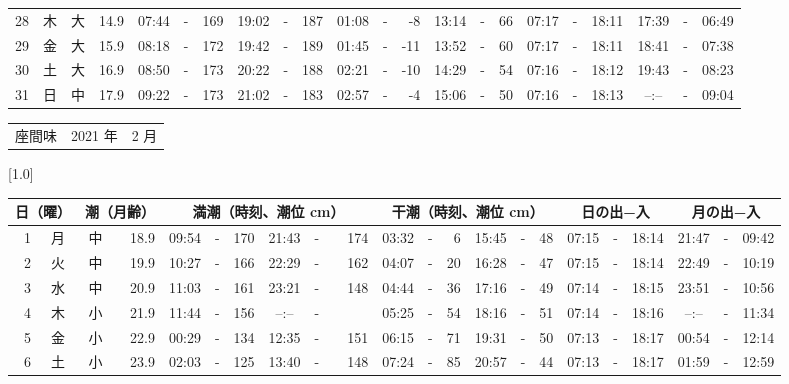 \documentclass[12pt,a4j]{jsarticle}
\begin{document}
\begin{table}[htbp]
\begin{center}
{\begin{tabular}{|rc|cr|ccrccr|ccrccr|ccc|ccc|}
28 & 木 & 大 & 14.9 &  07:44 &-& 169 &  19:02 &-& 187 &  01:08 &-&  -8 &  13:14 &-&  66 & 07:17 & -& 18:11 & 17:39 & -& 06:49 \\
29 & 金 & 大 & 15.9 &  08:18 &-& 172 &  19:42 &-& 189 &  01:45 &-& -11 &  13:52 &-&  60 & 07:17 & -& 18:11 & 18:41 & -& 07:38 \\
30 & 土 & 大 & 16.9 &  08:50 &-& 173 &  20:22 &-& 188 &  02:21 &-& -10 &  14:29 &-&  54 & 07:16 & -& 18:12 & 19:43 & -& 08:23 \\
31 & 日 & 中 & 17.9 &  09:22 &-& 173 &  21:02 &-& 183 &  02:57 &-&  -4 &  15:06 &-&  50 & 07:16 & -& 18:13 & --:-- & -& 09:04 \\
   \hline
   \end{tabular}}
   \end{center}
\end{table}
\newpage
 \begin{table}[htbp]
 \begin{center}
 \begin{tabular}{lcc}
 \LARGE{座間味}  & \large{2021 年} & \large{ 2 月} \\
 \end{tabular}
 \end{center}
 \begin{center}
    \scalebox{0.7}[1.0]{
    \begin{tabular}{|rc|cr|ccrccr|ccrccr|ccc|ccc|}
    \hline
    \multicolumn{2}{|c|}{日（曜）} & \multicolumn{2}{c|}{潮（月齢）} & \multicolumn{6}{c|}{満潮（時刻、潮位 cm）} & \multicolumn{6}{c|}{干潮（時刻、潮位 cm）} & \multicolumn{3}{c|}{日の出−入} &  \multicolumn{3}{c|}{月の出−入}\\
 \hline
 1 & 月 & 中 & 18.9 &  09:54 &-& 170 &  21:43 &-& 174 &  03:32 &-&   6 &  15:45 &-&  48 & 07:15 & -& 18:14 & 21:47 & -& 09:42 \\
 2 & 火 & 中 & 19.9 &  10:27 &-& 166 &  22:29 &-& 162 &  04:07 &-&  20 &  16:28 &-&  47 & 07:15 & -& 18:14 & 22:49 & -& 10:19 \\
 3 & 水 & 中 & 20.9 &  11:03 &-& 161 &  23:21 &-& 148 &  04:44 &-&  36 &  17:16 &-&  49 & 07:14 & -& 18:15 & 23:51 & -& 10:56 \\
 4 & 木 & 小 & 21.9 &  11:44 &-& 156 &  --:-- &-&~~~~~ &  05:25 &-&  54 &  18:16 &-&  51 & 07:14 & -& 18:16 & --:-- & -& 11:34 \\
 5 & 金 & 小 & 22.9 &  00:29 &-& 134 &  12:35 &-& 151 &  06:15 &-&  71 &  19:31 &-&  50 & 07:13 & -& 18:17 & 00:54 & -& 12:14 \\
 6 & 土 & 小 & 23.9 &  02:03 &-& 125 &  13:40 &-& 148 &  07:24 &-&  85 &  20:57 &-&  44 & 07:13 & -& 18:17 & 01:59 & -& 12:59 \\

\end{tabular}}
\end{center}
\end{table}
\end{document}
